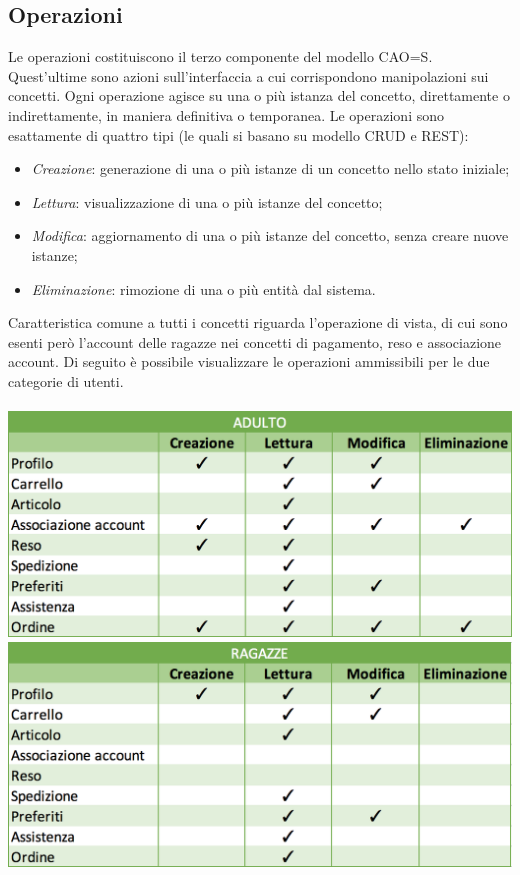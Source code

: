 \documentclass[12pt,a4paper]{report}
\begin{document}
\subsection{Operazioni}
Le operazioni costituiscono il terzo componente del modello CAO=S. Quest'ultime sono azioni sull'interfaccia a cui corrispondono manipolazioni sui concetti. Ogni operazione agisce su una o più istanza del concetto, direttamente o indirettamente, in maniera definitiva o temporanea. Le operazioni sono esattamente di quattro tipi (le quali si basano su modello CRUD e REST):\\
\begin{itemize}
  \item \textit{Creazione}: generazione di una o più istanze di un concetto nello stato iniziale;
  \item \textit{Lettura}: visualizzazione di una o più istanze del concetto;
  \item \textit{Modifica}: aggiornamento di una o più istanze del concetto, senza creare nuove istanze;
  \item \textit{Eliminazione}: rimozione di una o più entità dal sistema.
\end{itemize}
Caratteristica comune a tutti i concetti riguarda l'operazione di vista, di cui sono esenti però l'account delle ragazze nei concetti di pagamento, reso  e associazione account. Di seguito è possibile visualizzare le operazioni ammissibili per le due categorie di utenti.\\\\
\includegraphics[width=1\textwidth]{"Project Management Sources/OperazioniAdulto"}
\includegraphics[width=1\textwidth]{"Project Management Sources/OperazioniRagazze"}
\end{document}
